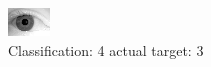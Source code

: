 \begin{figure}[h!]
\begin{center}
\includegraphics[width=0.60\columnwidth]{figures/ID2110_class_4_target_3.png}
\end{center}
\caption{ Classification: 4 actual target: 3}
\label{fig:ID2110_class_4_target_3}
\end{figure}
